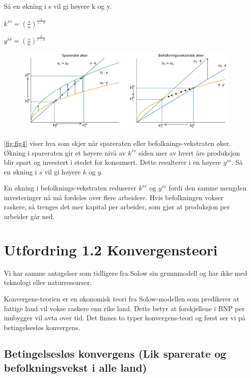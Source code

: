 \documentclass[
  12pt,
  a4paper,
  DIV=11,
  numbers=noendperiod]{scrartcl}
\begin{document}
Så en økning i s vil gi høyere k og y.

\(k^{ss}=\left( \frac{s}{n}\right)^{\frac{1}{1-\alpha}}\)

\(y^{ss}=\left( \frac{s}{n}\right)^\frac{\alpha}{1-\alpha}\)

\begin{figure}[b]
  \centering
  \includegraphics[width=\linewidth]{Figur2og3.png}
  \label{fig:fig4}
\end{figure}

\autoref{fig:fig4} viser hva som skjer når spareraten eller
befolknings-vekstraten øker. Økning i spareraten gir et høyere nivå av
\(k^{ss}\) siden mer av hvert års produksjon blir spart og investert i
stedet for konsumert. Dette resulterer i en høyere \(y^{ss}\). Så en
økning i \(s\) vil gi høyere \(k\) og \(y\).

En økning i befolknings-vekstraten reduserer \(k^{ss}\) og \(y^{ss}\)
fordi den samme mengden investeringer nå må fordeles over flere
arbeidere. Hvis befolkningen vokser raskere, så trenges det mer kapital
per arbeider, som gjør at produksjon per arbeider går ned.

\clearpage

\section{Utfordring 1.2
Konvergensteori}\label{utfordring-1.2-konvergensteori}

Vi har samme antagelser som tidligere fra Solow sin grunnmodell og har
ikke med teknologi eller naturressurser.

Konvergens-teorien er en økonomisk teori fra Solow-modellen som
predikerer at fattige land vil vokse raskere enn rike land. Dette betyr
at forskjellene i BNP per innbygger vil avta over tid. Det finnes to
typer konvergens-teori og først ser vi på betingelsesløs konvergens.

\subsection{\texorpdfstring{\textbf{Betingelsesløs konvergens (}Lik
sparerate og befolkningsvekst i alle
land)}{Betingelsesløs konvergens (Lik sparerate og befolkningsvekst i alle land)}}\label{betingelsesluxf8s-konvergens-lik-sparerate-og-befolkningsvekst-i-alle-land}
\end{document}
